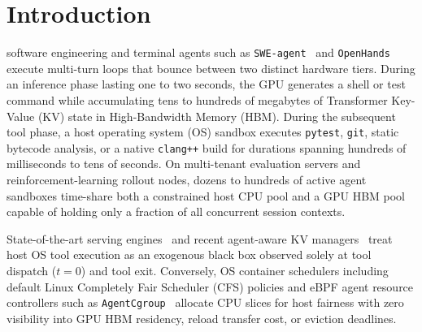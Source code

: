 \documentclass[10pt,journal,compsoc]{IEEEtran}
\theoremstyle{definition}
\theoremstyle{remark}
\begin{document}
\maketitle
\IEEEdisplaynontitleabstractindextext
\IEEEpeerreviewmaketitle

\section{Introduction}

 software engineering and terminal agents such as \texttt{SWE-agent}~\cite{yang2024sweagent} and \texttt{OpenHands}~\cite{wang2025openhands} execute multi-turn loops that bounce between two distinct hardware tiers. During an inference phase lasting one to two seconds, the GPU generates a shell or test command while accumulating tens to hundreds of megabytes of Transformer Key-Value (KV) state in High-Bandwidth Memory (HBM). During the subsequent tool phase, a host operating system (OS) sandbox executes \texttt{pytest}, \texttt{git}, static bytecode analysis, or a native \texttt{clang++} build for durations spanning hundreds of milliseconds to tens of seconds. On multi-tenant evaluation servers and reinforcement-learning rollout nodes, dozens to hundreds of active agent sandboxes time-share both a constrained host CPU pool and a GPU HBM pool capable of holding only a fraction of all concurrent session contexts.

State-of-the-art serving engines~\cite{kwon2023vllm,zheng2024sglang,qin2025mooncake,xie2026strata} and recent agent-aware KV managers~\cite{li2025continuum,he2026unison,yang2026lachesis,zhang2026cachescout,zheng2026pbkv} treat host OS tool execution as an exogenous black box observed solely at tool dispatch ($t = 0$) and tool exit. Conversely, OS container schedulers including default Linux Completely Fair Scheduler (CFS) policies and eBPF agent resource controllers such as \texttt{AgentCgroup}~\cite{zheng2026agentcgroup} allocate CPU slices for host fairness with zero visibility into GPU HBM residency, reload transfer cost, or eviction deadlines.
\end{document}
